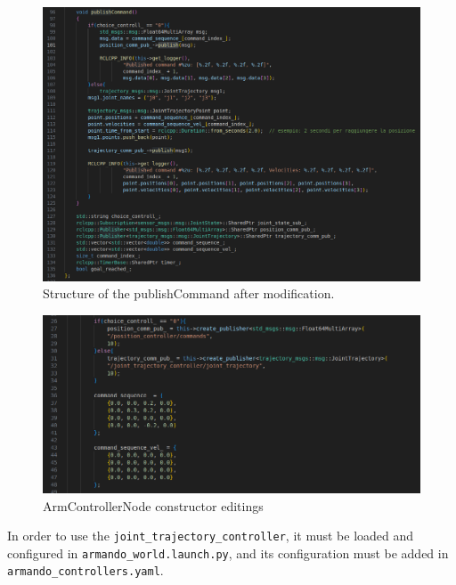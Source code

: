 \documentclass{article}
\begin{document}
\begin{enumerate}
\begin{figure}[H] %
  \centering
  \includegraphics[width=1\textwidth]{Images/4D_1.png} %
  \caption{Structure of the publishCommand after modification.} %
  \label{fig:publishCommand}
\end{figure}
\begin{figure}[H] %
  \centering
  \includegraphics[width=1\textwidth]{Images/4D_2_1.png} %
  \caption{ArmControllerNode constructor editings} %
  \label{fig:publishCommand}
\end{figure}

In order to use the \texttt{joint\_trajectory\_controller}, it must be loaded and configured 
in \texttt{armando\_world.launch.py}, and its configuration must be added in 
\texttt{armando\_controllers.yaml}.


\end{enumerate}
\end{document}
